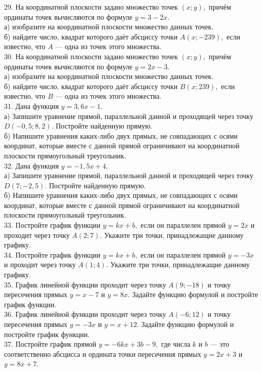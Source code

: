 \documentclass[12pt]{article}
\begin{document}
29. На координатной плоскости задано множество точек $(x;y),$ причём ординаты точек вычисляются по формуле $y=3-2x.$\\
а) изобразите на координатной плоскости множество данных точек.\\
б) найдите число, квадрат которого даёт абсциссу точки $A(x;-239),$ если известно, что $A$ --- одна из точек этого множества.\\
30. На координатной плоскости задано множество точек $(x;y),$ причём ординаты точек вычисляются по формуле $y=2x-3.$\\
а) изобразите на координатной плоскости множество данных точек.\\
б) найдите число, квадрат которого даёт абсциссу точки $B(x;239),$ если известно, что $B$ --- одна из точек этого множества.\\
31. Дана функция $y=3,6x-1.$\\
а) Запишите уравнение прямой, параллельной данной и проходящей через точку $D(-0,5;8,2).$ Постройте найденную прямую.\\
б) Напишите уравнения каких-либо двух прямых, не совпадающих с осями координат, которые вместе с данной прямой ограничивают на координатной плоскости прямоугольный треугольник.\\
32. Дана функция $y=-1,5x+4.$\\
а) Запишите уравнение прямой, параллельной данной и проходящей через точку $D(7;-2,5).$ Постройте найденную прямую.\\
б) Напишите уравнения каких-либо двух прямых, не совпадающих с осями координат, которые вместе с данной прямой ограничивают на координатной плоскости прямоугольный треугольник.\\
33. Постройте график функции $y=kx+b,$ если он параллелен прямой $y=2x$ и проходит через точку $A(2;7).$ Укажите три точки, принадлежащие данному графику.\\
34. Постройте график функции $y=kx+b,$ если он параллелен прямой $y=-3x$ и проходит через точку $A(1;4).$ Укажите три точки, принадлежащие данному графику.\\
35. График линейной функции проходит через точку $A(9;-18)$ и точку пересечения прямых $y=x-7$ и $y=8x.$ Задайте функцию формулой и постройте график функции.\\
36. График линейной функции проходит через точку $A(-6;12)$ и точку пересечения прямых $y=-3x$ и $y=x+12.$ Задайте функцию формулой и постройте график функции.\\
37. Постройте график прямой $y=-6kx+3b-9,$ где числа $k$ и $b$ --- это соответственно абсцисса и ордината точки пересечения прямых $y=2x+3$ и $y=8x+7.$\\
\end{document}
